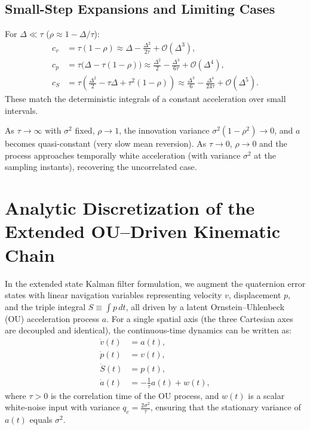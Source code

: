\documentclass[10pt]{extarticle}
\begin{document}
\subsection{Small-Step Expansions and Limiting Cases}
For $\Delta\ll\tau$ ($\rho \approx 1-\Delta/\tau$):
\begin{align}
c_v &= \tau(1-\rho) \approx \Delta - \tfrac{\Delta^2}{2\tau} + \mathcal{O}(\Delta^3),\\
c_p &= \tau\big(\Delta - \tau(1-\rho)\big) \approx \tfrac{\Delta^2}{2} - \tfrac{\Delta^3}{6\tau} + \mathcal{O}(\Delta^4),\\
c_S &= \tau\!\left(\tfrac{\Delta^2}{2} - \tau\Delta + \tau^2(1-\rho)\right) \approx \tfrac{\Delta^3}{6} - \tfrac{\Delta^4}{24\tau} + \mathcal{O}(\Delta^5).
\end{align}
These match the deterministic integrals of a constant acceleration over small intervals.

As $\tau\to\infty$ with $\sigma^2$ fixed, $\rho\to 1$, the innovation variance $\sigma^2(1-\rho^2)\to 0$,
and $a$ becomes quasi-constant (very slow mean reversion). As $\tau\to 0$, $\rho\to 0$ and
the process approaches temporally white acceleration (with variance $\sigma^2$ at the sampling instants),
recovering the uncorrelated case.

\section{Analytic Discretization of the Extended OU--Driven Kinematic Chain}

In the extended state Kalman filter formulation, we augment the quaternion
error states with linear navigation variables representing velocity
$v$, displacement $p$, and the triple integral $S \equiv \int p \, dt$,
all driven by a latent Ornstein--Uhlenbeck (OU) acceleration process $a$.
For a single spatial axis (the three Cartesian axes are decoupled and
identical), the continuous-time dynamics can be written as:
%
\begin{equation}
\begin{aligned}
\dot v(t) &= a(t), \\
\dot p(t) &= v(t), \\
\dot S(t) &= p(t), \\
\dot a(t) &= -\tfrac{1}{\tau} a(t) + w(t),
\end{aligned}
\label{eq:cont_system}
\end{equation}
%
where $\tau > 0$ is the correlation time of the OU process, and $w(t)$
is a scalar white-noise input with variance $q_c = \tfrac{2\sigma^2}{\tau}$,
ensuring that the stationary variance of $a(t)$ equals $\sigma^2$.
\end{document}
